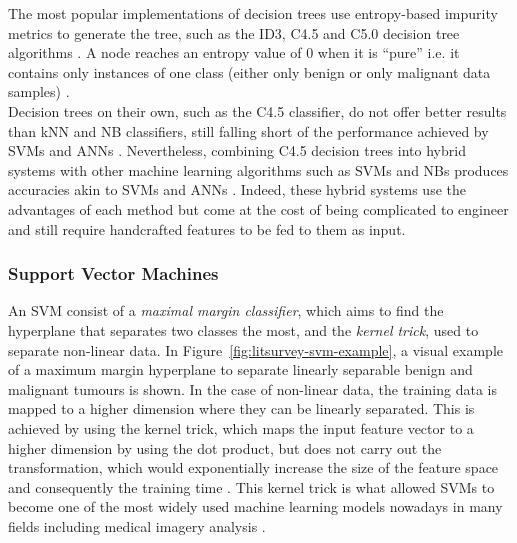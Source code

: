 The most popular implementations of decision trees use entropy-based impurity metrics to generate the tree, such as the ID3, C4.5 and C5.0 decision tree algorithms \citep{Yue2018}. A node reaches an entropy value of 0 when it is ``pure'' i.e. it contains only instances of one class (either only benign or only malignant data samples) \citep{Geron2019}.\\

Decision trees on their own, such as the C4.5 classifier, do not offer better results than kNN and NB classifiers, still falling short of the performance achieved by SVMs \citep{Asri2016} and ANNs \citep{Yue2018}. Nevertheless, combining C4.5 decision trees into hybrid systems with other machine learning algorithms such as SVMs and NBs produces accuracies akin to SVMs and ANNs \citep{Yue2018}. Indeed, these hybrid systems use the advantages of each method but come at the cost of being complicated to engineer and still require handcrafted features to be fed to them as input.

\subsubsection{Support Vector Machines}

An SVM consist of a \textit{maximal margin classifier}, which aims to find the hyperplane that separates two classes the most, and the \textit{kernel trick}, used to separate non-linear data. In Figure~\ref{fig:litsurvey-svm-example}, a visual example of a maximum margin hyperplane to separate linearly separable benign and malignant tumours is shown. In the case of non-linear data, the training data is mapped to a higher dimension where they can be linearly separated. This is achieved by using the kernel trick, which maps the input feature vector to a higher dimension by using the dot product, but does not carry out the transformation, which would exponentially increase the size of the feature space and consequently the training time \citep{Geron2019}. This kernel trick is what allowed SVMs to become one of the most widely used machine learning models nowadays in many fields including medical imagery analysis \citep{Yue2018}.\\

